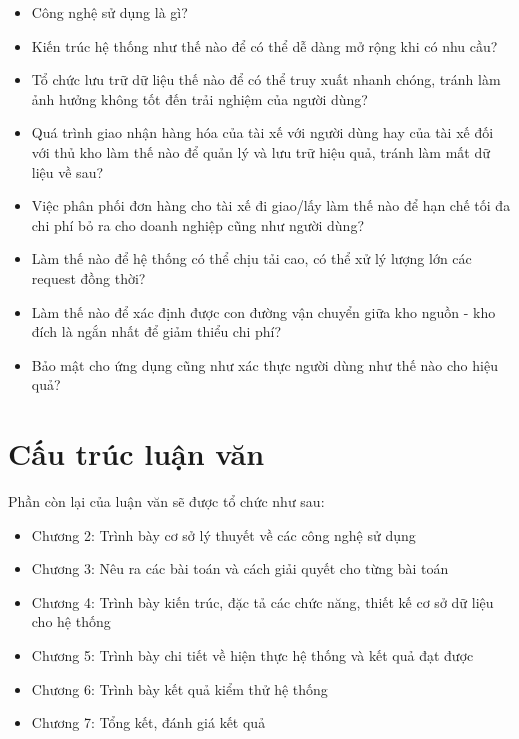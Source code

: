 	    \begin{itemize}
                \item Công nghệ sử dụng là gì?
                \item Kiến trúc hệ thống như thế nào để có thể dễ dàng mở rộng khi có nhu cầu?
                \item Tổ chức lưu trữ dữ liệu thế nào để có thể truy xuất nhanh chóng, tránh làm ảnh hưởng không tốt đến trải nghiệm của người dùng? 
                \item Quá trình giao nhận hàng hóa của tài xế với người dùng hay của tài xế đối với thủ kho làm thế nào để quản lý và lưu trữ hiệu quả, tránh làm mất dữ liệu về sau?
                \item Việc phân phối đơn hàng cho tài xế đi giao/lấy làm thế nào để hạn chế tối đa chi phí bỏ ra cho doanh nghiệp cũng như người dùng?
                \item Làm thế nào để hệ thống có thể chịu tải cao, có thể xử lý lượng lớn các request đồng thời? 
                \item Làm thế nào để xác định được con đường vận chuyển giữa kho nguồn - kho đích là ngắn nhất để giảm thiểu chi phí? 
                \item Bảo mật cho ứng dụng cũng như xác thực người dùng như thế nào cho hiệu quả?
            \end{itemize}
	    
	
	\section{Cấu trúc luận văn}
	 
	 Phần còn lại của luận văn sẽ được tổ chức như sau:
	 \begin{itemize}
                \item Chương 2: Trình bày cơ sở lý thuyết về các công nghệ sử dụng
                \item Chương 3: Nêu ra các bài toán và cách giải quyết cho từng bài toán
                \item Chương 4: Trình bày kiến trúc, đặc tả các chức năng, thiết kế cơ sở dữ liệu cho hệ thống
                \item Chương 5: Trình bày chi tiết về hiện thực hệ thống và kết quả đạt được
                \item Chương 6: Trình bày kết quả kiểm thử hệ thống
                \item Chương 7: Tổng kết, đánh giá kết quả
            \end{itemize}